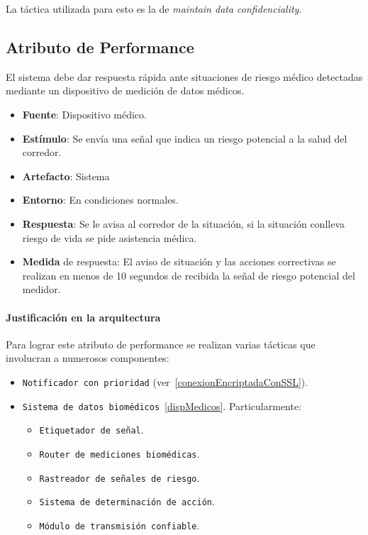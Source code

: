 La táctica utilizada para esto es la de \emph{maintain data confidenciality}.


\subsection{Atributo de Performance}
El sistema debe dar respuesta rápida ante situaciones de riesgo médico detectadas mediante un dispositivo de medición de datos médicos.

\begin{itemize}
  \item \textbf{Fuente}: Dispositivo médico.
  \item \textbf{Estímulo}: Se envía una señal que indica un riesgo potencial a la salud del corredor.
  \item \textbf{Artefacto}: Sistema
  \item \textbf{Entorno}: En condiciones normales.
  \item \textbf{Respuesta}: Se le avisa al corredor de la situación, si la situación conlleva riesgo de vida se pide asistencia médica.
  \item \textbf{Medida} de respuesta: El aviso de situación y las acciones correctivas se realizan en menos de 10 segundos de recibida la señal de riesgo potencial del medidor.
\end{itemize}

\paragraph{Justificación en la arquitectura}
Para lograr este atributo de performance se realizan varias tácticas que involucran a numerosos componentes: 
\begin{itemize}
  \item \texttt{Notificador con prioridad} (ver~\ref{conexionEncriptadaConSSL}).
  \item \texttt{Sistema de datos biomédicos}~\ref{dispMedicos}. Particularmente: 
  \begin{itemize}
    \item \texttt{Etiquetador de señal}.
    \item \texttt{Router de mediciones biomédicas}.
    \item \texttt{Rastreador de señales de riesgo}.
    \item \texttt{Sistema de determinación de acción}.
    \item \texttt{Módulo de transmisión confiable}.
  \end{itemize}
\end{itemize}

